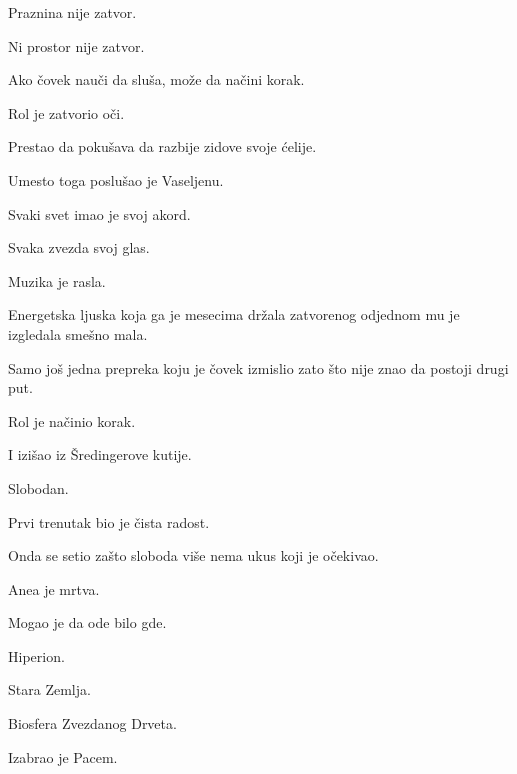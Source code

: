 Praznina nije zatvor.

\bigskip

Ni prostor nije zatvor.

\bigskip

Ako čovek nauči da sluša, može da načini korak.

\bigskip

Rol je zatvorio oči.

\bigskip

Prestao da pokušava da razbije zidove svoje ćelije.

\bigskip

Umesto toga poslušao je Vaseljenu.

\bigskip

Svaki svet imao je svoj akord.

\bigskip

Svaka zvezda svoj glas.

\bigskip

Muzika je rasla.

\bigskip

Energetska ljuska koja ga je mesecima držala zatvorenog odjednom mu je izgledala smešno mala.

\bigskip

Samo još jedna prepreka koju je čovek izmislio zato što nije znao da postoji drugi put.

\bigskip

Rol je načinio korak.

\bigskip

I izišao iz Šredingerove kutije.

\bigskip

Slobodan.

\bigskip

Prvi trenutak bio je čista radost.

\bigskip

Onda se setio zašto sloboda više nema ukus koji je očekivao.

\bigskip

Anea je mrtva.

\bigskip

Mogao je da ode bilo gde.

\bigskip

Hiperion.

Stara Zemlja.

Biosfera Zvezdanog Drveta.

\bigskip

Izabrao je Pacem.

\bigskip

